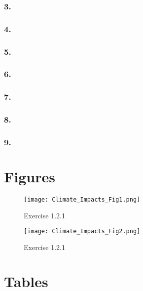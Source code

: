 \documentclass[12pt]{article}
\begin{document}
\subsubsection*{3.}

\subsubsection*{4.}

\subsubsection*{5.}

\subsubsection*{6.}

\subsubsection*{7.}

\subsubsection*{8.}

\subsubsection*{9.}

\clearpage

\section*{Figures}

\begin{figure}[h!]
\centering
\caption{Exercise 1.2.1}
\texttt{[image: Climate\_Impacts\_Fig1.png]}
\label{fig_climate_impacts_1}
\end{figure}


\begin{figure}[h!]
\centering
\caption{Exercise 1.2.1}
\texttt{[image: Climate\_Impacts\_Fig2.png]}
\label{fig_climate_impacts_2}
\end{figure}

\clearpage

\section*{Tables}



\clearpage


\end{document}
